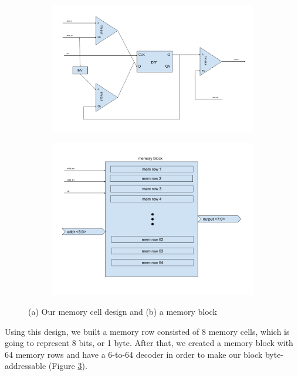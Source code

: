 \documentclass[letterpaper, 11pt]{article}
\begin{document}
	\begin{figure}[ht!]
		\centering
		\begin{subfigure}[b]{.4\linewidth}
			\includegraphics[width=\textwidth]{report_pics/memcell_block_diagram.png}
			\caption{}
			\label{fig4a}
		\end{subfigure}
		\begin{subfigure}[b]{.4\linewidth}
			\includegraphics[width=\textwidth]{report_pics/memblock_block_diagram.png}
			\caption{}
			\label{fig4b}
		\end{subfigure}
		\caption{(a) Our memory cell design and (b) a memory block}
	\end{figure}
	
	Using this design, we built a memory row consisted of 8 memory cells, which is going to represent 8 bits, or 1 byte. After that, we created a memory block with 64 memory rows and have a 6-to-64 decoder in order to make our block byte-addressable (Figure \ref{fig4b}).
	
\end{document}
